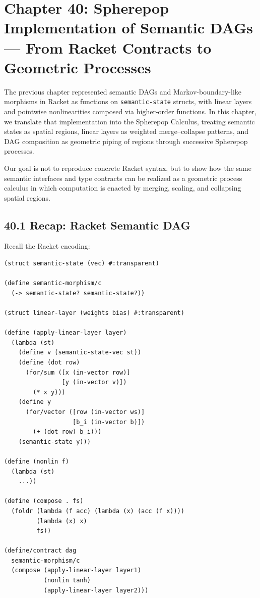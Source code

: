 \documentclass[12pt,letterpaper]{article}
\theoremstyle{remark}
\begin{document}
\newpage

\section{Chapter 40: Spherepop Implementation of Semantic DAGs —  
From Racket Contracts to Geometric Processes}

The previous chapter represented semantic DAGs and Markov-boundary-like morphisms in Racket as functions on \texttt{semantic-state} structs, with linear layers and pointwise nonlinearities composed via higher-order functions. In this chapter, we translate that implementation into the Spherepop Calculus, treating semantic states as spatial regions, linear layers as weighted merge--collapse patterns, and DAG composition as geometric piping of regions through successive Spherepop processes.

Our goal is not to reproduce concrete Racket syntax, but to show how the same semantic interfaces and type contracts can be realized as a geometric process calculus in which computation is enacted by merging, scaling, and collapsing spatial regions.

\subsection{40.1 Recap: Racket Semantic DAG}

Recall the Racket encoding:

\begin{verbatim}
(struct semantic-state (vec) #:transparent)

(define semantic-morphism/c
  (-> semantic-state? semantic-state?))

(struct linear-layer (weights bias) #:transparent)

(define (apply-linear-layer layer)
  (lambda (st)
    (define v (semantic-state-vec st))
    (define (dot row)
      (for/sum ([x (in-vector row)]
                [y (in-vector v)])
        (* x y)))
    (define y
      (for/vector ([row (in-vector ws)]
                   [b_i (in-vector b)])
        (+ (dot row) b_i)))
    (semantic-state y)))

(define (nonlin f)
  (lambda (st)
    ...))

(define (compose . fs)
  (foldr (lambda (f acc) (lambda (x) (acc (f x))))
         (lambda (x) x)
         fs))

(define/contract dag
  semantic-morphism/c
  (compose (apply-linear-layer layer1)
           (nonlin tanh)
           (apply-linear-layer layer2)))
\end{verbatim}
\end{document}
